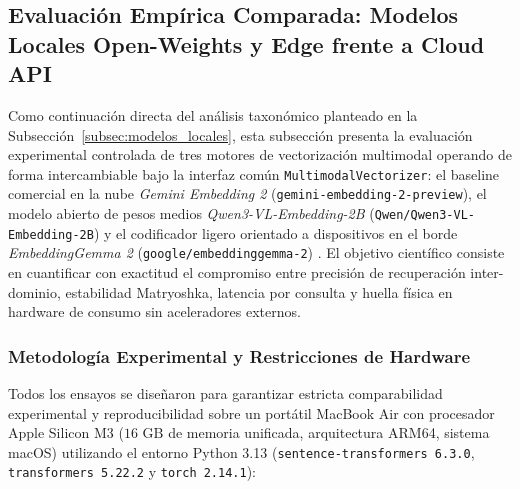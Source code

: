 \subsection{Evaluación Empírica Comparada: Modelos Locales Open-Weights y Edge frente a Cloud API}
\label{subsec:comparativa_backends_locales}

Como continuación directa del análisis taxonómico planteado en la Subsección~\ref{subsec:modelos_locales}, esta subsección presenta la evaluación experimental controlada de tres motores de vectorización multimodal operando de forma intercambiable bajo la interfaz común \texttt{MultimodalVectorizer}: el baseline comercial en la nube \textit{Gemini Embedding 2} (\texttt{gemini-embedding-2-preview}), el modelo abierto de pesos medios \textit{Qwen3-VL-Embedding-2B} (\texttt{Qwen/Qwen3-VL-Embedding-2B}) \cite{qwen3_vl_emb2026, hf_qwen3_2b} y el codificador ligero orientado a dispositivos en el borde \textit{EmbeddingGemma 2} (\texttt{google/embeddinggemma-2}) \cite{hf_embeddinggemma2}. El objetivo científico consiste en cuantificar con exactitud el compromiso entre precisión de recuperación inter-dominio, estabilidad Matryoshka, latencia por consulta y huella física en hardware de consumo sin aceleradores externos.

\subsubsection{Metodología Experimental y Restricciones de Hardware}
\label{subsubsec:metodologia_backends_locales}

Todos los ensayos se diseñaron para garantizar estricta comparabilidad experimental y reproducibilidad sobre un portátil MacBook Air con procesador Apple Silicon M3 ($16\text{ GB}$ de memoria unificada, arquitectura ARM64, sistema macOS) utilizando el entorno Python 3.13 (\texttt{sentence-transformers 6.3.0}, \texttt{transformers 5.22.2} y \texttt{torch 2.14.1}):

